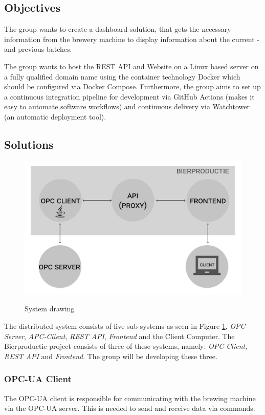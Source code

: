 \subsection{Objectives}
The group wants to create a dashboard solution, that gets the necessary
information from the brewery machine to display information about the current
- and previous batches.

The group wants to host the REST API and Website on a Linux based server on a
fully qualified domain name using the container technology Docker which should
be configured via Docker Compose. Furthermore, the group aims to set up a
continuous integration pipeline for development via GitHub Actions (makes it
easy to automate software workflows) and continuous delivery via Watchtower (an
automatic deployment tool).

\subsection{Solutions}
\begin{figure}[h]
\centering 
\includegraphics[scale=0.3]{../project_proposal/images/system_drawing.pdf}
\label{figure:System_drawing}
\caption{System drawing} 
\end{figure}

The distributed system consists of five sub-systems as seen in Figure
\ref{figure:System_drawing}, \textit{OPC-Server}, \textit{APC-Client},
\textit{REST API}, \textit{Frontend} and the Client Computer. The Bierproductie
project consists of three of these systems, namely: \textit{OPC-Client},
\textit{REST API} and \textit{Frontend}. The group will be developing these
three.

\subsubsection{OPC-UA Client}
The OPC-UA client is responsible for communicating with the brewing machine via
the OPC-UA server. This is needed to send and receive data via
commands.

